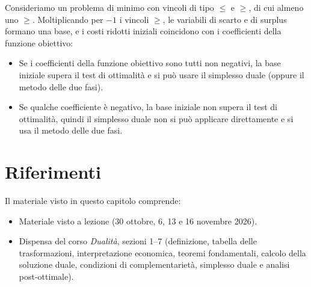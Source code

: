 \begin{osservazione}
Consideriamo un problema di minimo con vincoli di tipo $\le$ e $\ge$, di cui almeno uno $\ge$. Moltiplicando per $-1$ i vincoli $\ge$, le variabili di scarto e di surplus formano una base, e i costi ridotti iniziali coincidono con i coefficienti della funzione obiettivo:
\begin{itemize}
    \item Se i coefficienti della funzione obiettivo sono tutti non negativi, la base iniziale supera il test di ottimalità e si può usare il simplesso duale (oppure il metodo delle due fasi).
    \item Se qualche coefficiente è negativo, la base iniziale non supera il test di ottimalità, quindi il simplesso duale non si può applicare direttamente e si usa il metodo delle due fasi.
\end{itemize}
\end{osservazione}

\section*{Riferimenti}
Il materiale visto in questo capitolo comprende:
\begin{itemize}
    \item Materiale visto a lezione (30 ottobre, 6, 13 e 16 novembre 2026).
    \item Dispensa del corso \emph{Dualità}, sezioni 1--7 (definizione, tabella delle trasformazioni, interpretazione economica, teoremi fondamentali, calcolo della soluzione duale, condizioni di complementarietà, simplesso duale e analisi post-ottimale).
\end{itemize}
